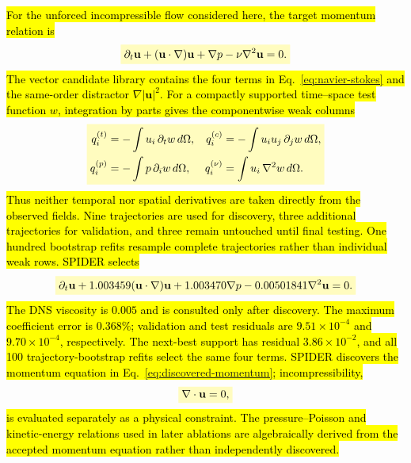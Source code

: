 \documentclass[preprint,12pt]{elsarticle}
\newcommand{\rev}[1]{\hl{#1}}
\newcommand{\revmath}[1]{\colorbox{yellow!25}{$#1$}}
\begin{document}
\rev{For the unforced incompressible flow considered here, the target momentum relation is}
\begin{equation}
\label{eq:navier-stokes}
\revmath{\displaystyle \partial_t\mathbf{u}+(\mathbf{u}\cdot\nabla)\mathbf{u}+\nabla p-\nu\nabla^2\mathbf{u}=0.}
\end{equation}
\rev{The vector candidate library contains the four terms in Eq.~\eqref{eq:navier-stokes} and the same-order distractor $\nabla|\mathbf{u}|^2$. For a compactly supported time--space test function $w$, integration by parts gives the componentwise weak columns}
\begin{equation}
\label{eq:weak-residuals}
\revmath{\displaystyle
\begin{aligned}
q_i^{(t)}&=-\int u_i\,\partial_t w\,d\Omega, &
q_i^{(c)}&=-\int u_i u_j\,\partial_jw\,d\Omega,\\
q_i^{(p)}&=-\int p\,\partial_iw\,d\Omega, &
q_i^{(\nu)}&=\int u_i\,\nabla^2w\,d\Omega.
\end{aligned}}
\end{equation}
\rev{Thus neither temporal nor spatial derivatives are taken directly from the observed fields. Nine trajectories are used for discovery, three additional trajectories for validation, and three remain untouched until final testing. One hundred bootstrap refits resample complete trajectories rather than individual weak rows. SPIDER selects}
\begin{equation}
\label{eq:discovered-momentum}
\revmath{\displaystyle
\partial_t\mathbf u+1.003459(\mathbf u\cdot\nabla)\mathbf u
+1.003470\nabla p-0.00501841\nabla^2\mathbf u=0.}
\end{equation}
\rev{The DNS viscosity is $0.005$ and is consulted only after discovery. The maximum coefficient error is $0.368\%$; validation and test residuals are $9.51\times10^{-4}$ and $9.70\times10^{-4}$, respectively. The next-best support has residual $3.86\times10^{-2}$, and all 100 trajectory-bootstrap refits select the same four terms. SPIDER discovers the momentum equation in Eq.~\eqref{eq:discovered-momentum}; incompressibility,}
\begin{equation}
\label{eq:continuity}
\revmath{\displaystyle \nabla\cdot\mathbf u=0,}
\end{equation}
\rev{is evaluated separately as a physical constraint. The pressure--Poisson and kinetic-energy relations used in later ablations are algebraically derived from the accepted momentum equation rather than independently discovered.}
\end{document}
